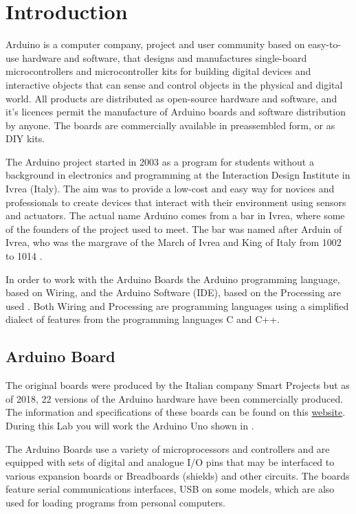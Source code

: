 \section{Introduction}
Arduino is a computer company, project and user community based on easy-to-use hardware and software, that designs and manufactures single-board microcontrollers and microcontroller kits for building digital devices and interactive objects that can sense and control objects in the physical and digital world. All products are distributed as open-source hardware and software, and it's licences permit the manufacture of Arduino boards and software distribution by anyone. The boards are commercially available in preassembled form, or as \ac{DIY} kits.\par

The Arduino project started in 2003 as a program for students without a background in electronics and programming at the Interaction Design Institute in Ivrea (Italy). The aim was to provide a low-cost and easy way for novices and professionals to create devices that interact with their environment using sensors and actuators. The actual name Arduino comes from a bar in Ivrea, where some of the founders of the project used to meet. The bar was named after Arduin of Ivrea, who was the margrave of the March of Ivrea and King of Italy from 1002 to 1014 \cite{wiki:1}. \par

In order to work with the Arduino Boards the Arduino programming language, based on Wiring, and the Arduino Software (\ac{IDE}), based on the Processing are used \cite{arduino:1}. Both Wiring and Processing are programming languages using a simplified dialect of features from the programming languages C and C++.

\subsection{Arduino Board}
The original boards were produced by the Italian company Smart Projects but as of 2018,
22 versions of the Arduino hardware have been commercially produced. The information and specifications of these boards can be found on this {\href{https://www.arduino.cc/en/Products/Compare}{website}}. During this Lab you will work the Arduino Uno shown in . \par 

The Arduino Boards use a variety of microprocessors and controllers and are equipped with sets of digital and analogue \ac{I/O} pins that may be interfaced to various expansion boards or Breadboards (shields) and other circuits. The boards feature serial communications interfaces, \ac{USB} on some models, which are also used for loading programs from personal computers.\par

